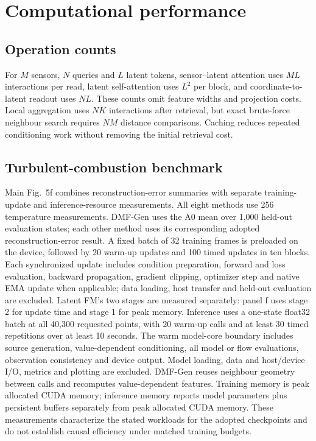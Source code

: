 \documentclass[11pt]{article}
\newcommand{\sisubsection}[1]{%
\FloatBarrier
\Needspace{5\baselineskip}%
\subsection{#1}%
}
\begin{document}
\FloatBarrier
{}
\section{Computational performance}
\label{sec:compute}
\sisubsection{Operation counts}
For $M$ sensors, $N$ queries and $L$ latent tokens, sensor--latent attention uses $ML$ interactions per read, latent self-attention uses $L^2$ per block, and coordinate-to-latent readout uses $NL$. These counts omit feature widths and projection costs. Local aggregation uses $NK$ interactions after retrieval, but exact brute-force neighbour search requires $NM$ distance comparisons. Caching reduces repeated conditioning work without removing the initial retrieval cost.

\sisubsection{Turbulent-combustion benchmark}
\label{subsec:compute-combustion}
{
Main Fig.~5f combines reconstruction-error summaries with separate training-update and inference-resource measurements. All eight methods use 256 temperature measurements. DMF-Gen uses the A0 mean over 1,000 held-out evaluation states; each other method uses its corresponding adopted reconstruction-error result. A fixed batch of 32 training frames is preloaded on the device, followed by 20 warm-up updates and 100 timed updates in ten blocks. Each synchronized update includes condition preparation, forward and loss evaluation, backward propagation, gradient clipping, optimizer step and native EMA update when applicable; data loading, host transfer and held-out evaluation are excluded. Latent FM's two stages are measured separately: panel f uses stage 2 for update time and stage 1 for peak memory. Inference uses a one-state float32 batch at all 40,300 requested points, with 20 warm-up calls and at least 30 timed repetitions over at least 10 seconds. The warm model-core boundary includes source generation, value-dependent conditioning, all model or flow evaluations, observation consistency and device output. Model loading, data and host/device I/O, metrics and plotting are excluded. DMF-Gen reuses neighbour geometry between calls and recomputes value-dependent features. Training memory is peak allocated CUDA memory; inference memory reports model parameters plus persistent buffers separately from peak allocated CUDA memory. These measurements characterize the stated workloads for the adopted checkpoints and do not establish causal efficiency under matched training budgets.
}
\end{document}
